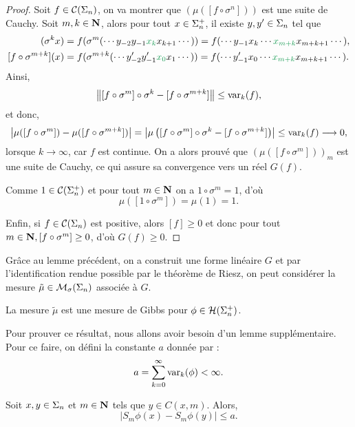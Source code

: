   \begin{proof}
    Soit $f \in \Cs{n}$, on va montrer que $(\mu([f\circ\sigma^n]))$ est une suite de Cauchy. Soit $m, k \in \N$,
    alors pour tout $x \in \sp_n$, il existe $y, y' \in \s_n$ tel que
    \begin{align*}
	[f\circ\sigma^m](\sigma^k x) &= f(\sigma^m(\cdots y_{-2}y_{-1}\textcolor{ForestGreen}{x_k}x_{k+1}\cdots))
		= f(\cdots y_{-1}x_k\cdots \textcolor{ForestGreen}{x_{m+k}}x_{m+k+1}\cdots), \\
	[f\circ\sigma^{m+k}](x) &= f(\sigma^{m+k}(\cdots y'_{-2}y'_{-1}\textcolor{ForestGreen}{x_0}x_1\cdots))
	    = f(\cdots y'_{-1}x_0\cdots\textcolor{ForestGreen}{x_{m+k}}x_{m+k+1}\cdots).
    \end{align*}
    Ainsi,
    $$\No{[f\circ\sigma^m]\circ\sigma^k - [f\circ\sigma^{m+k}]} \leq \var_k(f),$$
    et donc,
    $$\left| \mu([f\circ\sigma^m]) - \mu([f\circ\sigma^{m+k}]) \right| = \left|\mu\left([f\circ\sigma^m]\circ\sigma^k - [f\circ\sigma^{m+k}]\right) \right|
		\leq \var_k(f) \longrightarrow 0,$$
    lorsque $k \to \infty$, car $f$ est continue.
    On a alors prouvé que $(\mu([f\circ\sigma^m]))_m$ est une suite de Cauchy, ce qui assure sa convergence vers un réel $G(f)$.

    Comme $1 \in \Csp{n}$ et pour tout $m\in\N$ on a $1\circ\sigma^m = 1$, d'où
    $$\mu([1 \circ\sigma^m]) = \mu(1) = 1.$$

    Enfin, si $f \in \Cs{n}$ est positive, alors $[f] \geq 0$ et donc pour tout $m \in \N, [f \circ \sigma^m] \geq 0$,
    d'où $G(f) \geq 0$.
  \end{proof}

  Grâce au lemme précédent, on a construit une forme linéaire $G$ et par l'identification rendue possible par le théorème de Riesz,
  on peut considérer la mesure $\tilde{\mu} \in \Mss{n}$ associée à $G$.

  \begin{theorem} \label{thm:existence}
    La mesure $\tilde\mu$ est une mesure de Gibbs pour $\phi \in \Hsp{n}$.
  \end{theorem}

  Pour prouver ce résultat, nous allons avoir besoin d'un lemme supplémentaire. Pour ce faire, on défini la constante $a$ donnée par :
  $$a = \sum_{k=0}^{\infty}{\var_k(\phi)} < \infty.$$

  \begin{lemma}
    Soit $x, y \in \s_n$ et $m \in \N$ tels que $y \in C(x, m)$.
    Alors,
    $$\left| S_m\phi(x) - S_m\phi(y)\right| \leq a.$$
  \end{lemma}

